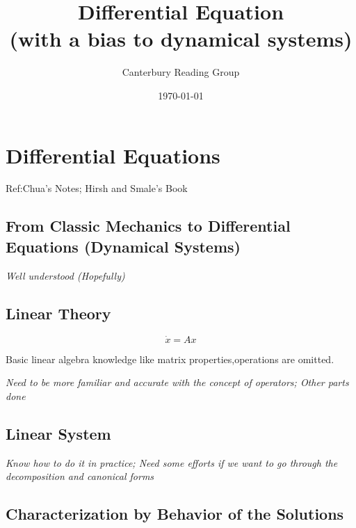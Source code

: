\documentclass[12pt,oneside]{book}
\begin{document}
    \title{Differential Equation\\ (with a bias to dynamical systems)}\author{Canterbury Reading Group}\date{\today}\maketitle
    \tableofcontents
    \chapter{Differential Equations}
    Ref:Chua's Notes; Hirsh and Smale's Book
    \section{From Classic Mechanics to Differential Equations (Dynamical Systems)}
    
    \textit{Well understood (Hopefully)}
    \section{Linear Theory}
    \begin{equation}
    	\dot{x}=Ax
    \end{equation}
    


	Basic linear algebra knowledge like matrix properties,operations are omitted.
	
	
	\textit{Need to be more familiar and accurate with the concept of operators; Other parts done}
	\section{Linear System}
	
    \textit{Know how to do it in practice; Need some efforts if we want to go through the decomposition and canonical forms}
    
    \section{Characterization by Behavior of the Solutions}
    
\end{document}
